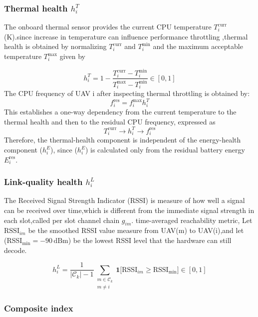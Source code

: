 \documentclass[journal]{IEEEtran}
\begin{document}
\subsubsection{Thermal health $h_{i}^{T}$}
The onboard thermal sensor provides the current CPU temperature $T_{i}^{\mathrm{curr}}$ (K).since increase in temperature can influence performance throttling ,thermal health is obtained by normalizing $T_{i}^{\mathrm{curr}}$ and $T_{i}^{\min}$ and the maximum acceptable temperature $T_{i}^{\max}$ given by

\begin{equation}\label{eq:hT}
  h_{i}^{T}=1-\frac{T_{i}^{\mathrm{curr}}-T_{i}^{\min}}
                   {T_{i}^{\max}-T_{i}^{\min}}\in[0,1]
\end{equation}
The CPU frequency of UAV i after inspecting thermal throttling is obtained by:
\begin{equation}\label{eq:fres}
  f_{i}^{\mathrm{res}}=f_{i}^{\max} h_{i}^{T}
\end{equation}
This establishes a one-way dependency from the current temperature to the thermal health and then to the residual CPU frequency, expressed as
\[T_i^{\mathrm{curr}} \rightarrow h_i^T \rightarrow f_i^{\mathrm{res}}\]
Therefore, the thermal-health component is independent of the energy-health component ($h_i^E$), since ($h_i^E$) is calculated only from the residual battery energy $E_i^{\mathrm{res}}$.


\subsubsection{Link-quality health $h_{i}^{L}$}


The Received Signal Strength Indicator (RSSI) is measure of how well a signal can be received over time,which is different from the immediate signal strength in each slot,called per slot channel chain $g_{im}$. 
time-averaged reachability metric, Let $\mathrm{RSSI}_{im}$ be the smoothed RSSI value measure from UAV(m) to UAV(i),and let (RSSI$_{\min} = -90\,\text{dBm}$) be the lowest RSSI level that the hardware can still decode.

\begin{equation}\label{eq:hL}
  h_{i}^{L}=\frac{1}{|\mathcal{C}_{k}|-1}
  \sum_{\substack{m\in\mathcal{C}_{k}\\m\neq i}}
  \mathbf{1}\bigl[\mathrm{RSSI}_{im}\geq\mathrm{RSSI}_{\min}\bigr]
  \in[0,1]
\end{equation}

\subsubsection{Composite index}
\end{document}

